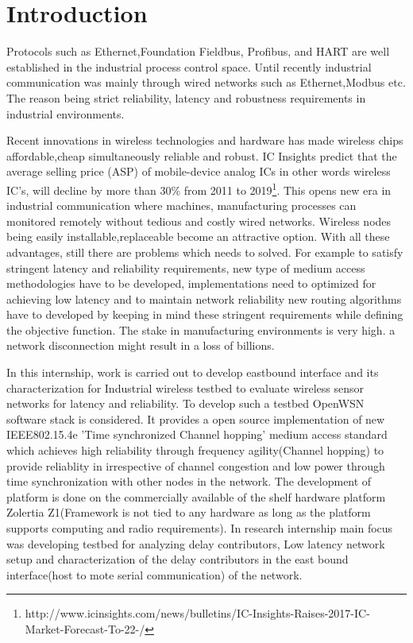 \chapter{Introduction}
Protocols such as Ethernet,Foundation Fieldbus, Profibus, and HART are well established in the industrial
process control space. Until recently industrial communication was mainly through wired networks such as Ethernet,Modbus etc. The reason being strict reliability, latency and robustness requirements in industrial environments.

Recent innovations in wireless technologies and hardware has made wireless chips affordable,cheap simultaneously reliable and robust. IC Insights predict that the average selling price (ASP) of mobile-device analog ICs in other words wireless IC's, will decline by more than 30\% from 2011 to 2019\footnote{http://www.icinsights.com/news/bulletins/IC-Insights-Raises-2017-IC-Market-Forecast-To-22-/}. This opens new era in industrial communication where machines, manufacturing processes can monitored remotely without tedious and costly wired networks. Wireless nodes being easily installable,replaceable become an attractive option. With all these advantages, still there are problems which needs to solved. For example to satisfy stringent latency and reliability requirements, new type of medium access methodologies have to be developed, implementations need to optimized for achieving low latency and to maintain network reliability new routing algorithms have to developed by keeping in mind these stringent requirements while defining the objective function.
The stake in manufacturing environments is very high. a network disconnection might result in a loss of billions.

In this internship, work is carried out to develop eastbound interface and its characterization for Industrial wireless testbed to evaluate wireless sensor networks for latency and reliability. To develop such a testbed OpenWSN software stack is considered. It provides a open source implementation of new IEEE802.15.4e 'Time synchronized Channel hopping' medium access standard which achieves high reliability through frequency agility(Channel hopping) to provide reliablity in irrespective of channel congestion and low power through time synchronization with other nodes in the network. The development of platform is done on the commercially available of the shelf hardware platform Zolertia Z1(Framework is not tied to any hardware as long as the platform supports computing and radio requirements). In research internship main focus was developing testbed for analyzing delay contributors, Low latency network setup and characterization of the delay contributors in the east bound interface(host to mote serial communication) of the network.

